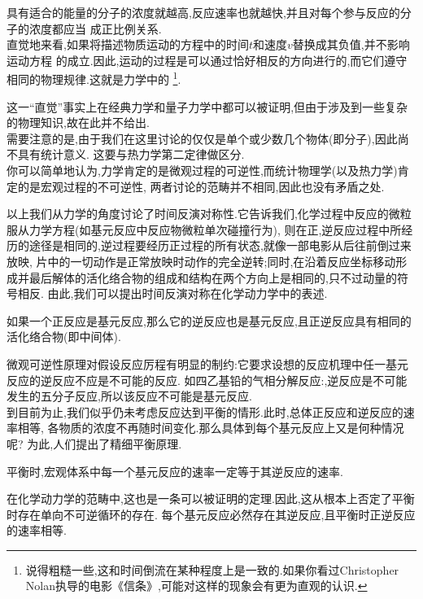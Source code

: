 \documentclass{ctexart}
\begin{document}
具有适合的能量的分子的浓度就越高,反应速率也就越快,并且对每个参与反应的分子的浓度都应当%
成正比例关系.\vspace{4pt}\\
\indent 直觉地来看,如果将描述物质运动的方程中的时间$t$和速度$v$替换成其负值,并不影响运动方程%
的成立.因此,运动的过程是可以通过恰好相反的方向进行的,而它们遵守相同的物理规律.这就是力学中的%
\footnote{说得粗糙一些,这和时间倒流在某种程度上是一致的.如果你看过Christopher Nolan执导的电影《信条》,可能对这样的现象会有更为直观的认识.}.
\begin{hint}
    这一“直觉”事实上在经典力学和量子力学中都可以被证明,但由于涉及到一些复杂的物理知识,故在此并不给出.\\
    需要注意的是,由于我们在这里讨论的仅仅是单个或少数几个物体(即分子),因此尚不具有统计意义.%
    这要与热力学第二定律做区分.\\
    你可以简单地认为,力学肯定的是微观过程的可逆性,而统计物理学(以及热力学)肯定的是宏观过程的不可逆性,%
    两者讨论的范畴并不相同,因此也没有矛盾之处.
\end{hint}
以上我们从力学的角度讨论了时间反演对称性.它告诉我们,化学过程中反应的微粒服从力学方程(如基元反应中反应物微粒单次碰撞行为),%
则在正,逆反应过程中所经历的途径是相同的,逆过程要经历正过程的所有状态,就像一部电影从后往前倒过来放映,%
片中的一切动作是正常放映时动作的完全逆转;同时,在沿着反应坐标移动形成并最后解体的活化络合物的组成和结构在两个方向上是相同的,只不过动量的符号相反.%
由此,我们可以提出时间反演对称在化学动力学中的表述.
\begin{theorem}[7C.1.4 微观可逆性原理]
    如果一个正反应是基元反应,那么它的逆反应也是基元反应,且正逆反应具有相同的活化络合物(即中间体).
\end{theorem}
微观可逆性原理对假设反应厉程有明显的制约:它要求设想的反应机理中任一基元反应的逆反应不应是不可能的反应.%
如四乙基铅的气相分解反应:,逆反应是不可能发生的五分子反应,所以该反应不可能是基元反应.\\
\indent 到目前为止,我们似乎仍未考虑反应达到平衡的情形.此时,总体正反应和逆反应的速率相等,%
各物质的浓度不再随时间变化.那么具体到每个基元反应上又是何种情况呢?%
为此,人们提出了精细平衡原理.
\begin{theorem}[7C.1.5 精细平衡原理]
    平衡时,宏观体系中每一个基元反应的速率一定等于其逆反应的速率.
\end{theorem}
在化学动力学的范畴中,这也是一条可以被证明的定理.因此,这从根本上否定了平衡时存在单向不可逆循环的存在.%
每个基元反应必然存在其逆反应,且平衡时正逆反应的速率相等.%
\end{document}
